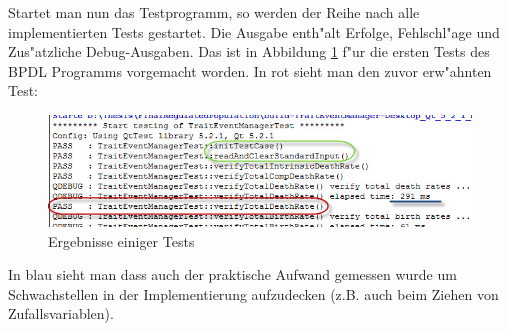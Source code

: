 \documentclass[11pt, a4paper, german]{article}
\theoremstyle{plain}
\begin{document}
	Startet man nun das Testprogramm, so werden der Reihe nach alle implementierten Tests gestartet. Die Ausgabe enth"alt Erfolge, Fehlschl"age und Zus"atzliche Debug-Ausgaben. Das ist in Abbildung \ref{Test Results} f"ur die ersten Tests des BPDL Programms vorgemacht worden. In rot sieht man den zuvor erw"ahnten Test:
	\begin{figure}[H]
		\centering
		\includegraphics[width=1 \linewidth]{./Pictures/TestResult_start_death}
		\caption[Test Resultat einer Test Datei]{Ergebnisse einiger Tests}
		\label{Test Results}
	\end{figure}
	In blau sieht man dass auch der praktische Aufwand gemessen wurde um Schwachstellen in der Implementierung aufzudecken (z.B. auch beim Ziehen von Zufallsvariablen).\\
	
\end{document}
